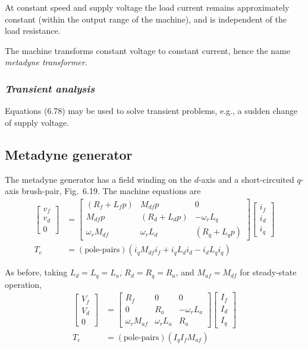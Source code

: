 \documentclass[a4paper,numbers=noenddot,12pt]{scrbook}
\begin{document}
At constant speed and supply voltage the load current remains approximately constant (within the output range of the machine), and is independent of the load resistance.

The machine transforms constant voltage to constant current, hence the name \textit{metadyne transformer}.

\subsubsection{\textit{Transient analysis}}
Equations (6.78) may be used to solve transient problems, e.g., a sudden change of supply voltage.

\subsection{Metadyne generator}
The metadyne generator has a field winding on the $d$-axis and a short-circuited $q$-axis brush-pair, Fig.\ 6.19. The machine equations are
\begin{align}
    \begin{bmatrix}
        v_f \\ v_d \\ 0
    \end{bmatrix}
    & =
    \begin{bmatrix}
        (R_f + L_f p) & M_{df} p & 0 \\
        M_{df} p & (R_d + L_d p) & -\omega_r L_q \\
        \omega_r M_{df} & \omega_r L_d & (R_q + L_q p) 
    \end{bmatrix}
    \begin{bmatrix}
        i_f \\ i_d \\ i_q
    \end{bmatrix} \\
    T_e & = (\text{pole-pairs})(i_q M_{df} i_f + i_q L_d i_d - i_d L_q i_q)
    \label{eq:Eq6.84}
\end{align}

As before, taking $L_d = L_q = L_a$, $R_d = R_q = R_a$, and $M_{af} = M_{df}$ for steady-state operation,
\begin{align}
    \begin{bmatrix}
        V_f \\ V_d \\ 0
    \end{bmatrix}
    & =
    \begin{bmatrix}
        R_f & 0 & 0 \\
        0 & R_a & -\omega_r L_a \\
        \omega_r M_{af} & \omega_r L_a & R_a 
    \end{bmatrix}
    \begin{bmatrix}
        I_f \\ I_d \\ I_q
    \end{bmatrix} \\
    T_e & = (\text{pole-pairs})(I_q I_f M_{af})
    \label{eq:Eq6.86}
\end{align}
\end{document}

